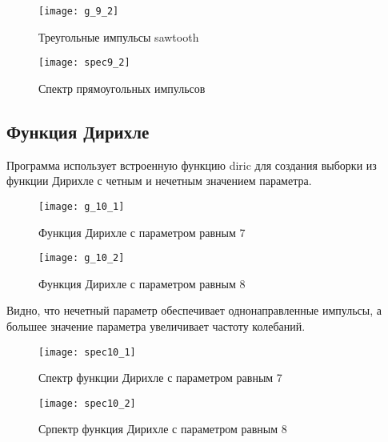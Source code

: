 \begin{figure}[H]
	\begin{center}
		\texttt{[image: g\_9\_2]}
		\caption{Треугольные импульсы sawtooth} 
		\label{pic:g_9_2} %
	\end{center}
\end{figure}
\begin{figure}[H]
	\begin{center}
		\texttt{[image: spec9\_2]}
		\caption{Спектр прямоугольных импульсов} 
		\label{pic:spec9_2} %
	\end{center}
\end{figure}

\subsection{Функция Дирихле}


\parindent=1cm
Программа использует встроенную функцию diric для создания выборки из функции Дирихле с четным и нечетным значением параметра.

\begin{figure}[H]
	\begin{center}
		\texttt{[image: g\_10\_1]}
		\caption{Функция Дирихле с параметром равным 7} 
		\label{pic:g_10_1} %
	\end{center}
\end{figure}
\begin{figure}[H]
	\begin{center}
		\texttt{[image: g\_10\_2]}
		\caption{Функция Дирихле с параметром равным 8} 
		\label{pic:g_10_2} %
	\end{center}
\end{figure}
Видно, что нечетный параметр обеспечивает однонаправленные импульсы, а большее значение параметра увеличивает частоту колебаний.

\begin{figure}[H]
	\begin{center}
		\texttt{[image: spec10\_1]}
		\caption{Спектр функции Дирихле с параметром равным 7} 
		\label{pic:spec10_1} %
	\end{center}
\end{figure}
\begin{figure}[H]
	\begin{center}
		\texttt{[image: spec10\_2]}
		\caption{Српектр функция Дирихле с параметром равным 8} 
		\label{pic:spec10_2} %
	\end{center}
\end{figure}

